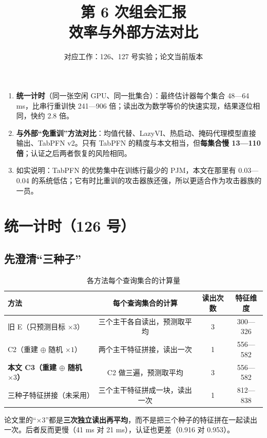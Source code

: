 \documentclass[zihao=-4,a4paper]{ctexart}
\title{\textbf{第 6 次组会汇报}\\[4pt]\Large 效率与外部方法对比}
\author{对应工作：126、127 号实验；论文当前版本}
\date{}
\begin{document}
\maketitle
\thispagestyle{empty}

\begin{keybox}
\begin{enumerate}[leftmargin=*]
  \item \textbf{统一计时}（同一张空闲 GPU、同一批集合）：最终估计器每个集合 48—64 ms，比串行重训快 241—906 倍；读出改为数学等价的快速实现，结果逐位相同，快约 2.8 倍。
  \item \textbf{与外部“免重训”方法对比}：均值代替、LazyVI、热启动、掩码代理模型直接输出、TabPFN v2。只有 TabPFN 的精度与本文相当，但\textbf{每集合慢 13—110 倍}；认证之后两者恢复的风险相同。
  \item 如实说明：TabPFN 的优势集中在训练行最少的 PJM，本文在那里有 0.03—0.04 的系统低估；它有时比重训的攻击器族还强，所以更适合作为攻击器族的一员。
\end{enumerate}
\end{keybox}

\section{统一计时（126 号）}

\subsection{先澄清“三种子”}

\begin{table}[H]\centering
\caption{各方法每个查询集合的计算量}
\small
\begin{tabular}{lccc}
\toprule
方法 & 每个查询集合的计算 & 读出次数 & 特征维度 \\
\midrule
旧 E（只预测目标 $\times3$） & 三个主干各自读出，预测取平均 & 3 & 300—326 \\
C2（重建 $\oplus$ 随机 $\times1$） & 两个主干特征拼接，读出一次 & 1 & 556—582 \\
\textbf{本文 C3（重建 $\oplus$ 随机 $\times3$）} & C2 做三遍，预测取平均 & 3 & 556—582 \\
三种子特征拼接（未采用） & 三个主干特征拼成一块，读出一次 & 1 & 812—838 \\
\bottomrule
\end{tabular}
\end{table}

论文里的“$\times3$”都是\textbf{三次独立读出再平均}，而不是把三个种子的特征拼在一起读出一次。后者反而更慢（41 ms 对 21 ms），认证也更差（0.916 对 0.953）。
\end{document}
